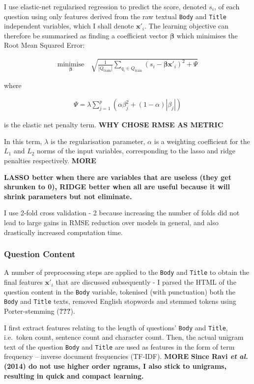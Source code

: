 \documentclass[11pt,preprint, authoryear]{article}
\numberwithin{equation}{section}
\begin{document}
I use elastic-net regularised regression to predict the score, denoted
\(s_i\), of each question using only features derived from the raw
textual \texttt{Body} and \texttt{Title} independent variables, which I
shall denote \(\bm{x'}_i\). The learning objective can therefore be
summarised as finding a coefficient vector \(\bm{\beta}\) which
minimises the Root Mean Squared Error:

\begin{align} \label{eq:rmse}
\underset{\bm{\beta}}{\text{minimise}} \quad \sqrt{ \frac{1}{|Q_\text{train}|} \sum_{ q_{i} \in Q_{\text{train}} } ( s_i - {\bm{\beta}\bm{x'}_i} )^2 + \Psi }
\end{align}

where

\begin{align} \label{eq:penalty}
\Psi = \lambda \sum_{j=1}^p ( \alpha\beta_j^2 + (1-\alpha)|\beta_j| )
\end{align}

is the elastic net penalty term. \textbf{WHY CHOSE RMSE AS METRIC}

In this term, \(\lambda\) is the regularisation parameter, \(\alpha\) is
a weighting coefficient for the \(L_1\) and \(L_2\) norms of the input
variables, corresponding to the lasso and ridge penalties respectively.
\textbf{MORE}

\textbf{LASSO better when there are variables that are useless (they get
shrunken to 0), RIDGE better when all are useful because it will shrink
parameters but not eliminate.}

I use 2-fold cross validation - 2 because increasing the number of folds
did not lead to large gains in RMSE reduction over models in general,
and also drastically increased computation time.

\subsubsection{Question Content}\label{question-content}

A number of preprocessing steps are applied to the \texttt{Body} and
\texttt{Title} to obtain the final features \(\bm{x'}_i\) that are
discussed subsequently - I parsed the HTML of the question content in
the \texttt{Body} variable, tokenised (with punctuation) both the
\texttt{Body} and \texttt{Title} texts, removed English stopwords and
stemmed tokens using Porter-stemming ({\textbf{???}}).

I first extract features relating to the length of questions'
\texttt{Body} and \texttt{Title}, i.e.~token count, sentence count and
character count. Then, the actual unigram text of the question
\texttt{Body} and \texttt{Title} are used as features in the form of
term frequency -- inverse document frequencies (TF-IDF). \textbf{MORE}
\textbf{Since Ravi \emph{et al.} (2014) do not use higher order ngrams,
I also stick to unigrams, resulting in quick and compact learning.}
\end{document}
